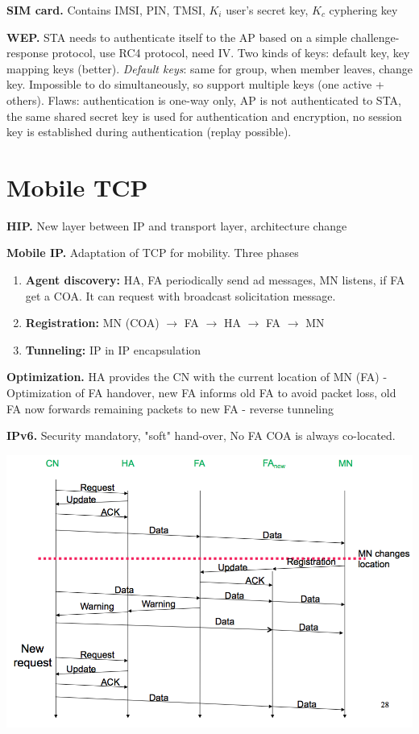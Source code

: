 \documentclass[10pt,twocolumn]{article}
\renewcommand{\bf}{\textbf}
\begin{document}
\bf{SIM card.} Contains IMSI, PIN, TMSI, $K_i$ user's secret key, $K_c$ cyphering key

\bf{WEP.} STA needs to authenticate itself to the AP based on a simple challenge-response protocol, use RC4 protocol, need IV. Two kinds of keys: default key, key mapping keys (better). \emph{Default keys}: same for group, when member leaves, change key.  Impossible to do simultaneously, so support multiple keys (one active + others). Flaws: authentication is one-way only, AP is not authenticated to STA, the same shared secret key is used for authentication and encryption, no session key is established during authentication (replay possible).

\section{Mobile TCP}

\bf{HIP.} New layer between IP and transport layer, architecture change

\bf{Mobile IP.} Adaptation of TCP for mobility. Three phases
\begin{enumerate}
  \item \bf{Agent discovery:} HA, FA periodically send ad messages, MN listens, if FA get a COA. It can request with broadcast solicitation message.
  \item \bf{Registration:} MN (COA) $\to$ FA $\to$ HA $\to$ FA $\to$ MN
  \item \bf{Tunneling:} IP in IP encapsulation
\end{enumerate}

\bf{Optimization.}  HA provides the CN with the current location of MN (FA) - Optimization of FA handover,  new FA informs old FA to avoid packet loss, old FA now forwards remaining packets to new FA - reverse tunneling

\bf{IPv6.} Security mandatory, "soft" hand-over, No FA COA is always co-located.

\includegraphics[width=\linewidth]{figures/mobile-ip-handover.png}
\end{document}
